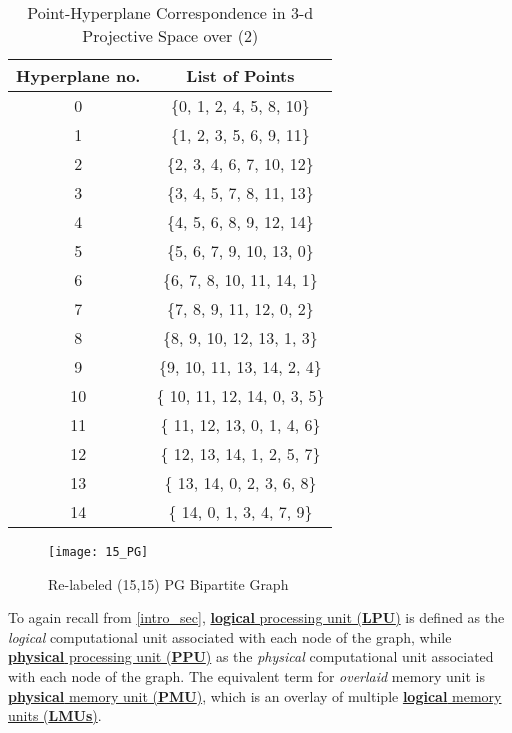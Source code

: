 \documentclass[12pt]{article}
\begin{document}
\begin{table}[h]
\caption{Point-Hyperplane Correspondence in 3-d Projective Space over
{(2)}}
\label{h_p_ex_tab}
\centering
{\normalsize
\begin{tabular}[!h]{|c|c|}
\hline
\textbf{Hyperplane no.} & \textbf{List of Points} \\ \hline \hline
0 & \{0, 1, 2, 4, 5, 8, 10\} \\ \hline
1 & \{1, 2, 3, 5, 6, 9, 11\} \\ \hline
2 & \{2, 3, 4, 6, 7, 10, 12\} \\ \hline
3 & \{3, 4, 5, 7, 8, 11, 13\} \\ \hline
4 & \{4, 5, 6, 8, 9, 12, 14\} \\ \hline
5 & \{5, 6, 7, 9, 10, 13, 0\} \\ \hline
6 & \{6, 7, 8, 10, 11, 14, 1\} \\ \hline
7 & \{7, 8, 9, 11, 12, 0, 2\} \\ \hline
8 & \{8, 9, 10, 12, 13, 1, 3\} \\ \hline
9 & \{9, 10, 11, 13, 14, 2, 4\} \\ \hline
10 & \{ 10, 11, 12, 14, 0, 3, 5\} \\ \hline
11 & \{ 11, 12, 13, 0, 1, 4, 6\} \\ \hline
12 & \{ 12, 13, 14, 1, 2, 5, 7\} \\ \hline
13 & \{ 13, 14, 0, 2, 3, 6, 8\} \\ \hline
14 & \{ 14, 0, 1, 3, 4, 7, 9\} \\ \hline

\end{tabular}
}
\end{table}

\begin{figure}[h]
\begin{center}
\texttt{[image: 15\_PG]}
\end{center}
\caption{Re-labeled (15,15) PG Bipartite Graph}
\label{15_pg_fig}
\end{figure}

To again recall from \ref{intro_sec}, \uline{\textbf{logical}
processing unit (\textbf{LPU})} is defined as the \textit{logical}
computational unit associated with each node of the graph, while
\uline{\textbf{physical} processing unit (\textbf{PPU})} as the
\textit{physical} computational unit associated with each node of the graph.
The equivalent term for \textit{overlaid} memory unit is
\uline{\textbf{physical} memory unit (\textbf{PMU})}, which is an overlay of
multiple \uline{\textbf{logical} memory units (\textbf{LMUs})}.
\end{document}
